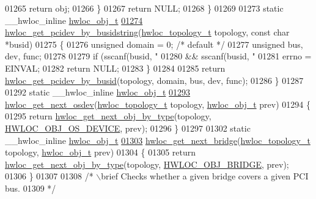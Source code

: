 \begin{DoxyCode}
01265       \textcolor{keywordflow}{return} obj;
01266   \}
01267   \textcolor{keywordflow}{return} NULL;
01268 \}
01269 
01273 \textcolor{keyword}{static} \_\_hwloc\_inline \hyperlink{a00016}{hwloc_obj_t}
\hypertarget{a00031_source_l01274}{}\hyperlink{a00064_ga9d5643f2e337fe1b98e7cce5c1ecb74e}{01274} \hyperlink{a00064_ga9d5643f2e337fe1b98e7cce5c1ecb74e}{hwloc_get_pcidev_by_busidstring}(\hyperlink{a00039_ga9d1e76ee15a7dee158b786c30b6a6e38}{hwloc_topology_t} topology, \textcolor{keyword}{const} \textcolor{keywordtype}{char} *busid)
01275 \{
01276   \textcolor{keywordtype}{unsigned} domain = 0; \textcolor{comment}{/* default */}
01277   \textcolor{keywordtype}{unsigned} bus, dev, func;
01278 
01279   \textcolor{keywordflow}{if} (sscanf(busid, \textcolor{stringliteral}{"%
01280       && sscanf(busid, \textcolor{stringliteral}{"%
01281     errno = EINVAL;
01282     \textcolor{keywordflow}{return} NULL;
01283   \}
01284 
01285   \textcolor{keywordflow}{return} \hyperlink{a00064_ga546e1d690c63fb24177f3013ed78ceb1}{hwloc_get_pcidev_by_busid}(topology, domain, bus, dev, func);
01286 \}
01287 
01292 \textcolor{keyword}{static} \_\_hwloc\_inline \hyperlink{a00016}{hwloc_obj_t}
\hypertarget{a00031_source_l01293}{}\hyperlink{a00064_ga73a5bc6265642e6001f7a10812ab886d}{01293} \hyperlink{a00064_ga73a5bc6265642e6001f7a10812ab886d}{hwloc_get_next_osdev}(\hyperlink{a00039_ga9d1e76ee15a7dee158b786c30b6a6e38}{hwloc_topology_t} topology, \hyperlink{a00016}{hwloc_obj_t} prev)
01294 \{
01295   \textcolor{keywordflow}{return} \hyperlink{a00053_ga5f08ceb69375341e73563cfe2e77534e}{hwloc_get_next_obj_by_type}(topology, \hyperlink{a00041_ggacd37bb612667dc437d66bfb175a8dc55a51e7280240fd9f25589cbbe538bdb075}{HWLOC_OBJ_OS_DEVICE}, prev);
01296 \}
01297 
01302 \textcolor{keyword}{static} \_\_hwloc\_inline \hyperlink{a00016}{hwloc_obj_t}
\hypertarget{a00031_source_l01303}{}\hyperlink{a00064_ga2bd3f856d0fc3c6c02642c17d763b823}{01303} \hyperlink{a00064_ga2bd3f856d0fc3c6c02642c17d763b823}{hwloc_get_next_bridge}(\hyperlink{a00039_ga9d1e76ee15a7dee158b786c30b6a6e38}{hwloc_topology_t} topology, \hyperlink{a00016}{hwloc_obj_t} prev)
01304 \{
01305   \textcolor{keywordflow}{return} \hyperlink{a00053_ga5f08ceb69375341e73563cfe2e77534e}{hwloc_get_next_obj_by_type}(topology, \hyperlink{a00041_ggacd37bb612667dc437d66bfb175a8dc55a6825f10895fea60aca7a6ba9fe273db0}{HWLOC_OBJ_BRIDGE}, prev);
01306 \}
01307 
01308 \textcolor{comment}{/* \(\backslash\)brief Checks whether a given bridge covers a given PCI bus.}
01309 \textcolor{comment}{ */}
}}
\end{DoxyCode}
